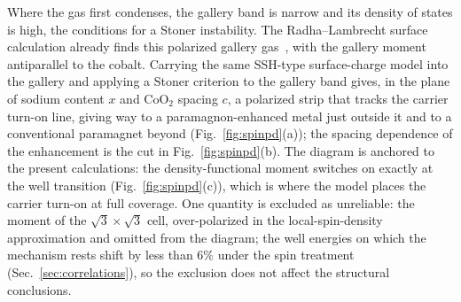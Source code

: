 \documentclass[aps,10pt,preprint,superscriptaddress,floatfix]{revtex4-2}
\begin{document}
Where the gas first condenses, the gallery band is narrow and its density of states is high, the
conditions for a Stoner instability. The Radha--Lambrecht surface calculation
already finds this polarized gallery gas~\cite{RadhaLambrecht2021}, with the gallery moment
antiparallel to the cobalt. Carrying the same SSH-type surface-charge model into the gallery and
applying a Stoner criterion to the gallery band gives, in the plane of sodium content $x$ and
CoO$_2$ spacing $c$, a polarized strip that tracks the carrier turn-on line, giving way to a
paramagnon-enhanced metal just outside it and to a conventional paramagnet beyond
(Fig.~\ref{fig:spinpd}(a)); the spacing dependence of the enhancement is the cut in
Fig.~\ref{fig:spinpd}(b). The diagram is anchored to the present calculations: the
density-functional moment switches on exactly at the well transition (Fig.~\ref{fig:spinpd}(c)),
which is where the model places the carrier turn-on at full coverage. 
{One quantity is excluded as
unreliable: the moment of the $\sqrt3\times\sqrt3$ cell, over-polarized in the local-spin-density
approximation and omitted from the diagram; the well energies on which the mechanism rests shift by
less than 6\% under the spin treatment (Sec.~\ref{sec:correlations}), so the exclusion does not
affect the structural conclusions.}
\end{document}
